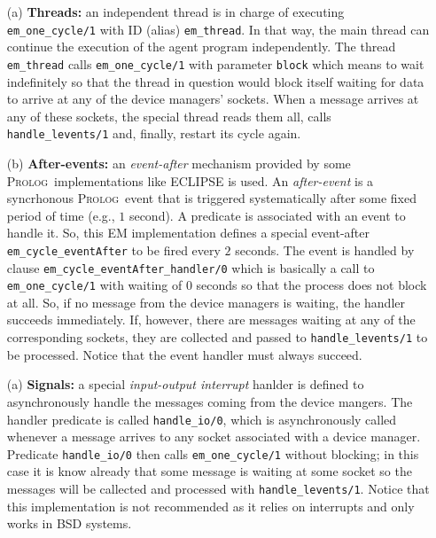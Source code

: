 \documentclass[11pt]{article}
\newcommand{\Prolog}{\mbox{\textsc{Prolog}}}
\begin{document}
%
\begin{enumerate}
\item[(a)] \textbf{Threads:} an independent thread is in charge of executing
\texttt{em\_one\_cycle/1} with ID (alias) \texttt{em\_thread}. In that way, the
main thread can continue the execution of the agent program independently.
%  
The thread \texttt{em\_thread} calls \texttt{em\_one\_cycle/1} with parameter
\texttt{block} which means to wait indefinitely so that the thread in question
would block itself waiting for data to arrive at any of the device managers'
sockets. 
%
When a message arrives at any of these sockets, the special thread reads them
all, calls \texttt{handle\_levents/1} and, finally, restart its cycle again.

\item[(b)] \textbf{After-events:} an \textit{event-after} mechanism provided
by some \Prolog\ implementations like ECLIPSE is used. 
%
An \textit{after-event} is a syncrhonous \Prolog\ event that is triggered
systematically after some fixed period of time (e.g., $1$ second). A predicate
is associated with an event to handle it.
%
So, this EM implementation defines a special event-after 
\texttt{em\_cycle\_eventAfter} to be fired every $2$ seconds. The event is
handled by clause \texttt{em\_cycle\_eventAfter\_handler/0} which is basically
a call to \texttt{em\_one\_cycle/1} with waiting of $0$ seconds so that the
process does not block at all. So, if no message from the device managers is
waiting, the handler succeeds immediately. If, however, there are messages
waiting at any of the corresponding sockets, they are collected and passed to
\texttt{handle\_levents/1} to be processed. Notice that the event handler
must always succeed.

\item[(a)] \textbf{Signals:} a special \textit{input-output interrupt} hanlder
is defined to asynchronously handle the messages coming from the device mangers.
%
The handler predicate is called \texttt{handle\_io/0}, which is 
asynchronously called whenever a message arrives to any socket associated with
a device manager.  Predicate \texttt{handle\_io/0} then calls
\texttt{em\_one\_cycle/1} without blocking; in this case it is know already
that some message is waiting at some socket so the messages will be callected
and processed with \texttt{handle\_levents/1}. Notice that this implementation
is not recommended as it relies on interrupts and only works in BSD systems.
\end{enumerate}
\end{document}
